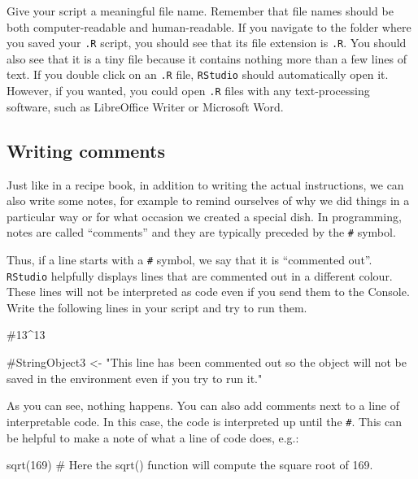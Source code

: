 \documentclass[
  letterpaper,
  DIV=11,
  numbers=noendperiod]{scrreprt}
\newenvironment{Shaded}{\begin{snugshade}}{\end{snugshade}}
\newcommand{\CommentTok}[1]{\textcolor[rgb]{0.37,0.37,0.37}{#1}}
\newcommand{\DecValTok}[1]{\textcolor[rgb]{0.68,0.00,0.00}{#1}}
\newcommand{\FunctionTok}[1]{\textcolor[rgb]{0.28,0.35,0.67}{#1}}
\newcommand{\NormalTok}[1]{\textcolor[rgb]{0.00,0.23,0.31}{#1}}
\begin{document}
Give your script a meaningful file name. Remember that file names should
be both computer-readable and human-readable. If you navigate to the
folder where you saved your \texttt{.R} script, you should see that its
file extension is \texttt{.R}. You should also see that it is a tiny
file because it contains nothing more than a few lines of text. If you
double click on an \texttt{.R} file, \texttt{RStudio} should
automatically open it. However, if you wanted, you could open
\texttt{.R} files with any text-processing software, such as LibreOffice
Writer or Microsoft Word.

\subsection{Writing comments}\label{writing-comments}

Just like in a recipe book, in addition to writing the actual
instructions, we can also write some notes, for example to remind
ourselves of why we did things in a particular way or for what occasion
we created a special dish. In programming, notes are called ``comments''
and they are typically preceded by the \texttt{\#} symbol.

Thus, if a line starts with a \texttt{\#} symbol, we say that it is
``commented out''. \texttt{RStudio} helpfully displays lines that are
commented out in a different colour. These lines will not be interpreted
as code even if you send them to the Console. Write the following lines
in your script and try to run them.

\begin{Shaded}
\begin{Highlighting}[]
\CommentTok{\#13\^{}13}

\CommentTok{\#StringObject3 \textless{}{-} "This line has been commented out so the object will not be saved in the environment even if you try to run it."}
\end{Highlighting}
\end{Shaded}

As you can see, nothing happens. You can also add comments next to a
line of interpretable code. In this case, the code is interpreted up
until the \texttt{\#}. This can be helpful to make a note of what a line
of code does, e.g.:

\begin{Shaded}
\begin{Highlighting}[]
\FunctionTok{sqrt}\NormalTok{(}\DecValTok{169}\NormalTok{) }\CommentTok{\# Here the sqrt() function will compute the square root of 169.}
\end{Highlighting}
\end{Shaded}
\end{document}
